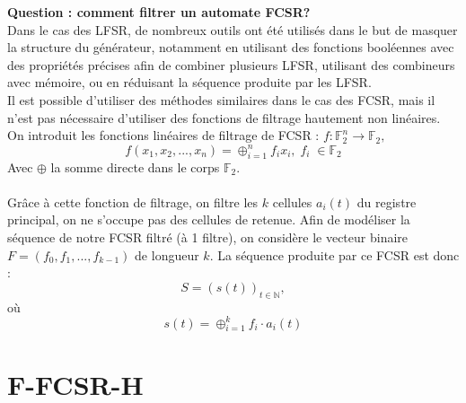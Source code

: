 \documentclass[11pt]{report}
\begin{document}
\textbf{Question : comment filtrer un automate FCSR?}\\
Dans le cas des LFSR, de nombreux outils ont été utilisés dans le but de masquer la structure du générateur, notamment en utilisant des fonctions booléennes avec des propriétés précises afin de combiner plusieurs LFSR, utilisant des combineurs avec mémoire, ou en réduisant la séquence produite par les LFSR.\\
Il est possible d'utiliser des méthodes similaires dans le cas des FCSR, mais il n'est pas nécessaire d'utiliser des fonctions de filtrage hautement non linéaires. 
\\
On introduit les fonctions linéaires de filtrage de FCSR : 
$
f: \mathbb{F}_2^n \rightarrow \mathbb{F}_2,
$
$$
f(x_1,x_2,...,x_n) = \oplus_{i=1}^n f_ix_i, \; f_i \; \in \mathbb{F}_2
$$
Avec $\oplus$ la somme directe dans le corps $\mathbb{F}_2$.
\\\\
Grâce à cette fonction de filtrage, on filtre les $k$ cellules $a_i(t)$ du registre principal, on ne s'occupe pas des cellules de retenue. Afin de modéliser la séquence de notre FCSR filtré (à 1 filtre), on considère le vecteur binaire $F=(f_0,f_1,...,f_{k-1})$ de longueur $k$. La séquence produite par ce FCSR est donc :
$$
S=(s(t))_{t \in \mathbb{N}},
$$
où
$$
s(t) = \oplus_{i=1}^k f_i \cdot a_i(t)
$$

\section{F-FCSR-H}
\end{document}
